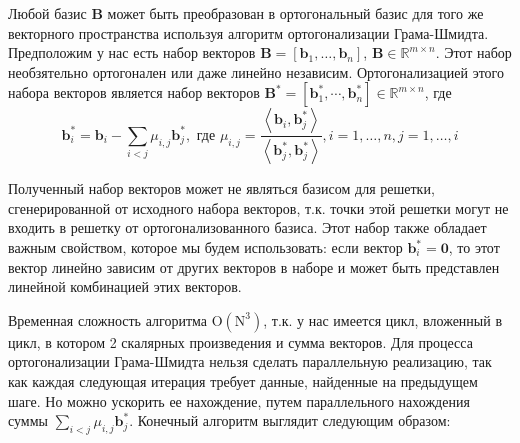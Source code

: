 Любой базис $ \mathbf{B} $ может быть преобразован в ортогональный базис для того же векторного пространства используя алгоритм ортогонализации Грама-Шмидта.
Предположим у нас есть набор векторов $ \mathbf{B} = [\mathbf{b}_1, \ldots, \mathbf{b}_n] $, $ \mathbf{B} \in \mathbb{R}^{m \times n} $. Этот набор необзятельно ортогонален или даже линейно независим. Ортогонализацией этого набора векторов является набор векторов $ \mathbf{B}^* = [\mathbf{b}^*_1, \cdots, \mathbf{b}^*_n] \in \mathbb{R}^{m \times n} $, где $$ \mathbf{b}^*_i = \mathbf{b}_i - \sum_{i < j} \mu_{i, j} \mathbf{b}^*_j, \text{ где } \mu_{i, j} = \frac{\left\langle \mathbf{b}_i, \mathbf{b}^*_j \right\rangle}{\left\langle \mathbf{b}^*_j, \mathbf{b}^*_j \right\rangle}, i = 1, \ldots, n, j = 1, \ldots, i $$

Полученный набор векторов может не являться базисом для решетки, сгенерированной от исходного набора векторов, т.к. точки этой решетки могут не входить в решетку от ортогонализованного базиса. Этот набор также обладает важным свойством, которое мы будем использовать: если вектор $ \mathbf{b}^*_i = \mathbf{0} $, то этот вектор линейно зависим от других векторов в наборе и может быть представлен линейной комбинацией этих векторов.

Временная сложность алгоритма $ \mathrm{O(N^3)} $, т.к. у нас имеется цикл, вложенный в цикл, в котором 2 скалярных произведения и сумма векторов. Для процесса ортогонализации Грама-Шмидта нельзя сделать параллельную реализацию, так как каждая следующая итерация требует данные, найденные на предыдущем шаге. Но можно ускорить ее нахождение, путем параллельного нахождения суммы $ \sum_{i < j} \mu_{i, j} \mathbf{b}^*_j $. Конечный алгоритм выглядит следующим образом:

\begin{algorithmic}

	
	\EndFor
	
\EndFor
\end{algorithmic}

